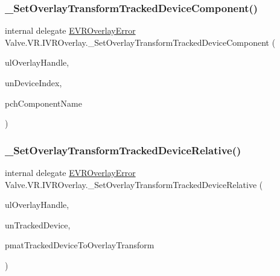 \subsubsection{\texorpdfstring{\_SetOverlayTransformTrackedDeviceComponent()}{\_SetOverlayTransformTrackedDeviceComponent()}}
{\footnotesize\ttfamily internal delegate \mbox{\hyperlink{namespace_valve_1_1_v_r_aaee5c5144f42b7969d45b854f51b0c18}{E\+V\+R\+Overlay\+Error}} Valve.\+V\+R.\+I\+V\+R\+Overlay.\+\_\+\+Set\+Overlay\+Transform\+Tracked\+Device\+Component (\begin{DoxyParamCaption}\item[{ulong}]{ul\+Overlay\+Handle,  }\item[{uint}]{un\+Device\+Index,  }\item[{string}]{pch\+Component\+Name }\end{DoxyParamCaption})}

\mbox{\label{struct_valve_1_1_v_r_1_1_i_v_r_overlay_ac83c23b8afe439475d80d3e64db9878d}} 
\subsubsection{\texorpdfstring{\_SetOverlayTransformTrackedDeviceRelative()}{\_SetOverlayTransformTrackedDeviceRelative()}}
{\footnotesize\ttfamily internal delegate \mbox{\hyperlink{namespace_valve_1_1_v_r_aaee5c5144f42b7969d45b854f51b0c18}{E\+V\+R\+Overlay\+Error}} Valve.\+V\+R.\+I\+V\+R\+Overlay.\+\_\+\+Set\+Overlay\+Transform\+Tracked\+Device\+Relative (\begin{DoxyParamCaption}\item[{ulong}]{ul\+Overlay\+Handle,  }\item[{uint}]{un\+Tracked\+Device,  }\item[{ref \mbox{\hyperlink{struct_valve_1_1_v_r_1_1_hmd_matrix34__t}{Hmd\+Matrix34\+\_\+t}}}]{pmat\+Tracked\+Device\+To\+Overlay\+Transform }\end{DoxyParamCaption})}

\mbox{\label{struct_valve_1_1_v_r_1_1_i_v_r_overlay_ae65d9b762f6024173ed7f2362e7755ce}} 
